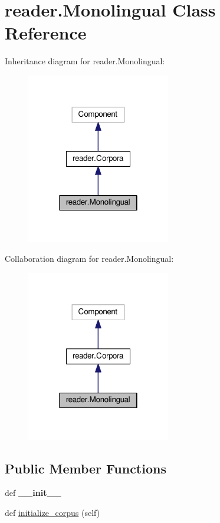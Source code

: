 \hypertarget{classreader_1_1Monolingual}{}\section{reader.\+Monolingual Class Reference}
\label{classreader_1_1Monolingual}


Inheritance diagram for reader.\+Monolingual\+:
\nopagebreak
\begin{figure}[H]
\begin{center}
\leavevmode
\includegraphics[width=178pt]{classreader_1_1Monolingual__inherit__graph}
\end{center}
\end{figure}


Collaboration diagram for reader.\+Monolingual\+:
\nopagebreak
\begin{figure}[H]
\begin{center}
\leavevmode
\includegraphics[width=178pt]{classreader_1_1Monolingual__coll__graph}
\end{center}
\end{figure}
\subsection*{Public Member Functions}
\begin{DoxyCompactItemize}
\item 
def {\bfseries \+\_\+\+\_\+init\+\_\+\+\_\+}\hypertarget{classreader_1_1Monolingual_aec3cf634198f4a6734d8a1bdb1c95a6f}{}\label{classreader_1_1Monolingual_aec3cf634198f4a6734d8a1bdb1c95a6f}

\item 
def \hyperlink{classreader_1_1Monolingual_abcd1180d6479b8a7203cad7deb0e7c8a}{initialize\+\_\+corpus} (self)
\end{DoxyCompactItemize}
